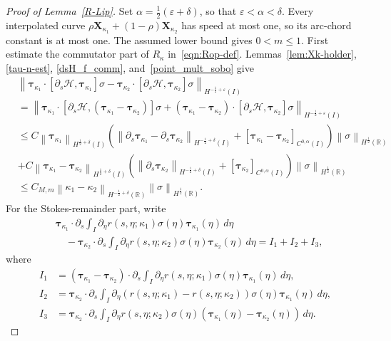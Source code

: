 \documentclass[11pt,reqno]{amsart}
\theoremstyle{plain}
\theoremstyle{definition}
\numberwithin{equation}{section}
\newcommand{\paren}[1]{\left(#1\right)}
\newcommand{\p}{\partial}
\newcommand{\mc}[1]{\mathcal{#1}}
\newcommand{\bm}[1]{\boldsymbol{#1}}
\newcommand{\norm}[1]{\left\lVert #1 \right\rVert}
\newcommand{\R}{\mathbb{R}}
\newcommand{\tka}[1]{\bm\tau_{\kappa_{#1}}}
\newcommand{\xka}[1]{\bm X_{\kappa_{#1}}}
\newcommand{\ci}[1]{C^{#1}(I)}
\newcommand{\hi}[1]{H^{#1}(I)}
\newcommand{\hr}[1]{H^{#1}(\R)}
\begin{document}
\begin{proof}[Proof of Lemma~\ref{R-Lip}]
Set $\alpha=\frac{1}{2}\paren{\varepsilon+\delta}$, so that
$\varepsilon<\alpha<\delta$. Every interpolated curve
$\rho\xka{1}+(1-\rho)\xka{2}$ has speed at most one, so its arc-chord
constant is at most one. The assumed lower bound gives
$0<m\le 1$.
First estimate the commutator part of $R_\kappa$ in~\eqref{eqn:Rop-def}. Lemmas~\ref{lem:Xk-holder},
\ref{tau-n-est}, \ref{dsH_f_comm}, and~\ref{point_mult_sobo} give
\begin{equation}
\begin{aligned}
    &\norm{ \tka{1}\cdot[\p_s\mc H,\tka{1}]\sigma - \tka{2}\cdot[\p_s\mc H,\tka{2}]\sigma }_{\hi{-\frac{1}{2}+\varepsilon}} \\
    & = \norm{ \tka{1}\cdot[\p_s\mc H,\paren{\tka{1}-\tka{2}}]\sigma + \paren{\tka{1}-\tka{2}}\cdot[\p_s\mc H,\tka{2}]\sigma }_{\hi{-\frac{1}{2}+\varepsilon}}\\
    &\le C \norm{\tka{1}}_{\hi{\frac{1}{2}+\delta}}\paren{\norm{\p_s\tka{1}-\p_s\tka{2}}_{\hi{-\frac{1}{2}+\delta}}+ [\tka{1}-\tka{2}]_{\ci{0,\alpha}}}\norm{\sigma}_{\hr{\frac{1}{2}}} \\
    & + C\norm{\tka{1}-\tka{2}}_{\hi{\frac{1}{2}+\delta}}\paren{\norm{\p_s\tka{2}}_{\hi{-\frac{1}{2}+\delta}}+ [\tka{2}]_{\ci{0,\alpha}}} \norm{\sigma}_{\hr{\frac{1}{2}}} \\
    &\le C_{M,m} \norm{\kappa_1-\kappa_2}_{\hr{-\frac{1}{2}+\delta}}\norm{\sigma}_{\hr{\frac{1}{2}}}.
\end{aligned}
\end{equation}
For the Stokes-remainder part, write
\begin{equation}
\begin{aligned}
    &\tka{1}\cdot\p_s\int_I \p_\eta r(s,\eta;\kappa_1)\sigma(\eta)\tka{1}(\eta)\,d\eta  \\
    &\quad - \tka{2}\cdot\p_s\int_I \p_\eta r(s,\eta;\kappa_2)\sigma(\eta)\tka{2}(\eta)\,d\eta = I_1 + I_2 +
    I_3,
\end{aligned}
\end{equation}
where
\begin{align}
I_1 & = \paren{\tka{1}-\tka{2}}\cdot\p_s\int_I \p_\eta r(s,\eta;\kappa_1)\sigma(\eta)\tka{1}(\eta)\,d\eta, \\
I_2 &= \tka{2}\cdot\p_s\int_I \p_\eta \paren{r(s,\eta;\kappa_1)-r(s,\eta;\kappa_2)}\sigma(\eta)\tka{1}(\eta)\,d\eta, \\
I_3 &= \tka{2}\cdot\p_s\int_I \p_\eta r(s,\eta;\kappa_2)\sigma(\eta)\paren{\tka{1}(\eta)-\tka{2}(\eta)} \,d\eta.

\end{align}
\end{proof}
\end{document}
